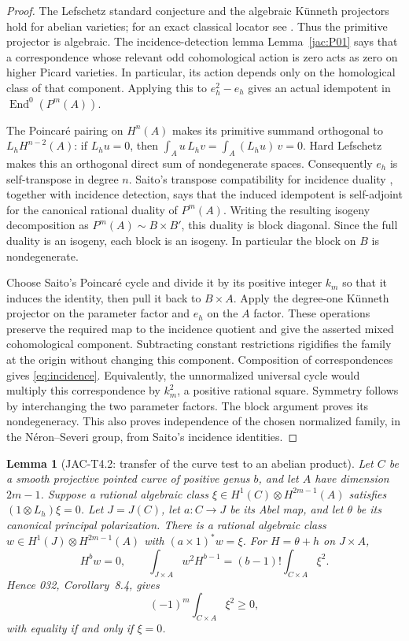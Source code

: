 \documentclass[11pt,a4paper]{article}
\newtheorem{lemma}[theorem]{Lemma}
\begin{document}
\begin{proof}
The Lefschetz standard conjecture and the algebraic K\"unneth projectors
hold for abelian varieties; for an exact classical locator see
\cite[Theorem~2A11]{Kleiman68}. Thus the primitive projector is algebraic.
The incidence-detection lemma Lemma~\ref{jac:P01} says that a correspondence
whose relevant odd cohomological action is zero acts as zero on higher
Picard varieties. In particular, its action depends only on the
homological class of that component. Applying this to $e_h^2-e_h$ gives
an actual idempotent in $\operatorname{End}^0(P^m(A))$.

The Poincar\'e pairing on $H^n(A)$ makes its primitive summand orthogonal
to $L_hH^{n-2}(A)$: if $L_hu=0$, then
$\int_Au\,L_hv=\int_A(L_hu)\,v=0$.
Hard Lefschetz makes this an orthogonal direct sum of nondegenerate
spaces. Consequently $e_h$ is self-transpose in degree $n$. Saito's
transpose compatibility for incidence duality
\cite[Proposition~4.4, especially (4.4.1)--(4.4.2)]{Saito1979}, together
with incidence detection, says that the induced idempotent is
self-adjoint for the canonical rational duality of $P^m(A)$.
Writing the resulting isogeny decomposition as
$P^m(A)\sim B\times B'$, this duality is block diagonal. Since the full
duality is an isogeny, each block is an isogeny. In particular the block
on $B$ is nondegenerate.

Choose Saito's Poincar\'e cycle and divide it by its positive integer
$k_m$ so that it induces the identity, then pull it back to $B\times A$.
Apply the degree-one K\"unneth projector on the parameter factor and
$e_h$ on the $A$ factor. These operations preserve the required map to
the incidence quotient and give the asserted mixed cohomological
component. Subtracting constant restrictions rigidifies the family at
the origin without changing this component. Composition of
correspondences gives \eqref{eq:incidence}. Equivalently, the
unnormalized universal cycle would multiply this correspondence by
$k_m^2$, a positive rational square. Symmetry follows by interchanging
the two parameter factors. The block argument proves its
nondegeneracy. This also proves independence of the chosen normalized
family, in the N\'eron--Severi group, from Saito's incidence identities.
\end{proof}

\begin{lemma}[JAC-T4.2: transfer of the curve test to an abelian product]
\label{lem:curve-test}
Let $C$ be a smooth projective pointed curve of positive genus $b$, and
let $A$ have dimension $2m-1$. Suppose a rational algebraic class
$\xi\in H^1(C)\otimes H^{2m-1}(A)$ satisfies
$(1\otimes L_h)\xi=0$. Let $J=J(C)$, let
$a:C\longrightarrow J$ be its Abel map, and let $\theta$ be its canonical
principal polarization. There is a rational algebraic class
$w\in H^1(J)\otimes H^{2m-1}(A)$ with
$(a\times1)^*w=\xi$. For $H=\theta+h$ on $J\times A$,
\begin{equation}\label{eq:curve-transfer}
 H^bw=0,\qquad
 \int_{J\times A}w^2H^{b-1}
 =(b-1)!\int_{C\times A}\xi^2.
\end{equation}
Hence 032, Corollary~8.4, gives
\[
 (-1)^m\int_{C\times A}\xi^2\ge0,
\]
with equality if and only if $\xi=0$.
\end{lemma}
\end{document}
